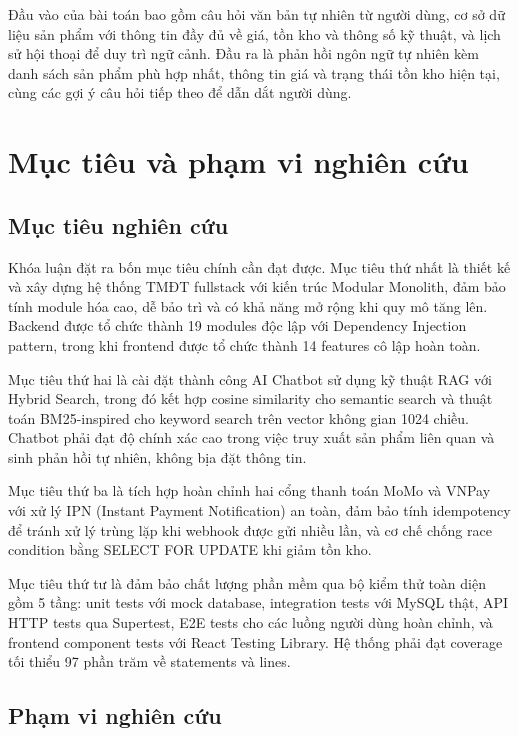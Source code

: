 Đầu vào của bài toán bao gồm câu hỏi văn bản tự nhiên từ người dùng, cơ sở dữ liệu sản phẩm với thông tin đầy đủ về giá, tồn kho và thông số kỹ thuật, và lịch sử hội thoại để duy trì ngữ cảnh. Đầu ra là phản hồi ngôn ngữ tự nhiên kèm danh sách sản phẩm phù hợp nhất, thông tin giá và trạng thái tồn kho hiện tại, cùng các gợi ý câu hỏi tiếp theo để dẫn dắt người dùng.

\section{Mục tiêu và phạm vi nghiên cứu}

\subsection{Mục tiêu nghiên cứu}

Khóa luận đặt ra bốn mục tiêu chính cần đạt được. Mục tiêu thứ nhất là thiết kế và xây dựng hệ thống TMĐT fullstack với kiến trúc Modular Monolith, đảm bảo tính module hóa cao, dễ bảo trì và có khả năng mở rộng khi quy mô tăng lên. Backend được tổ chức thành 19 modules độc lập với Dependency Injection pattern, trong khi frontend được tổ chức thành 14 features cô lập hoàn toàn.

Mục tiêu thứ hai là cài đặt thành công AI Chatbot sử dụng kỹ thuật RAG với Hybrid Search, trong đó kết hợp cosine similarity cho semantic search và thuật toán BM25-inspired cho keyword search trên vector không gian 1024 chiều. Chatbot phải đạt độ chính xác cao trong việc truy xuất sản phẩm liên quan và sinh phản hồi tự nhiên, không bịa đặt thông tin.

Mục tiêu thứ ba là tích hợp hoàn chỉnh hai cổng thanh toán MoMo và VNPay với xử lý IPN (Instant Payment Notification) an toàn, đảm bảo tính idempotency để tránh xử lý trùng lặp khi webhook được gửi nhiều lần, và cơ chế chống race condition bằng SELECT FOR UPDATE khi giảm tồn kho.

Mục tiêu thứ tư là đảm bảo chất lượng phần mềm qua bộ kiểm thử toàn diện gồm 5 tầng: unit tests với mock database, integration tests với MySQL thật, API HTTP tests qua Supertest, E2E tests cho các luồng người dùng hoàn chỉnh, và frontend component tests với React Testing Library. Hệ thống phải đạt coverage tối thiểu 97 phần trăm về statements và lines.

\subsection{Phạm vi nghiên cứu}

